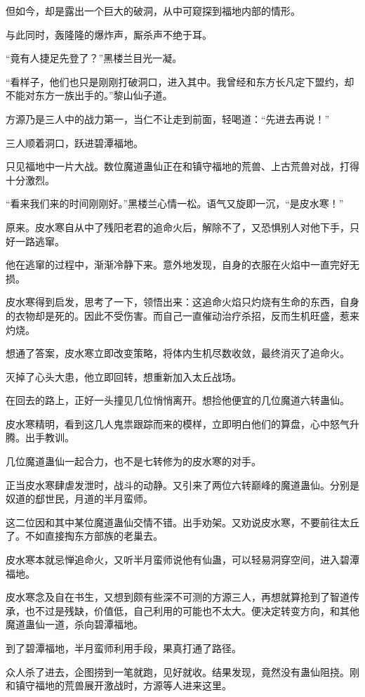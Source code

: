 \begin{this_body}
但如今，却是露出一个巨大的破洞，从中可窥探到福地内部的情形。

与此同时，轰隆隆的爆炸声，厮杀声不绝于耳。

“竟有人捷足先登了？”黑楼兰目光一凝。

“看样子，他们也只是刚刚打破洞口，进入其中。我曾经和东方长凡定下盟约，却不能对东方一族出手的。”黎山仙子道。

方源乃是三人中的战力第一，当仁不让走到前面，轻喝道：“先进去再说！”

三人顺着洞口，跃进碧潭福地。

只见福地中一片大战。数位魔道蛊仙正在和镇守福地的荒兽、上古荒兽对战，打得十分激烈。

“看来我们来的时间刚刚好。”黑楼兰心情一松。语气又旋即一沉，“是皮水寒！”

原来。皮水寒自从中了残阳老君的追命火后，解除不了，又恐惧别人对他下手，只好一路逃窜。

他在逃窜的过程中，渐渐冷静下来。意外地发现，自身的衣服在火焰中一直完好无损。

皮水寒得到启发，思考了一下，领悟出来：这追命火焰只灼烧有生命的东西，自身的衣物却是死的。因此不受伤害。而自己一直催动治疗杀招，反而生机旺盛，惹来灼烧。

想通了答案，皮水寒立即改变策略，将体内生机尽数收敛，最终消灭了追命火。

灭掉了心头大患，他立即回转，想重新加入太丘战场。

在回去的路上，正好一头撞见几位悄悄离开。想捡他便宜的几位魔道六转蛊仙。

皮水寒精明，看到这几人鬼祟跟踪而来的模样，立即明白他们的算盘，心中怒气升腾。出手教训。

几位魔道蛊仙一起合力，也不是七转修为的皮水寒的对手。

正当皮水寒肆虐发泄时，战斗的动静。又引来了两位六转巅峰的魔道蛊仙。分别是奴道的郄世民，月道的半月蛮师。

这二位因和其中某位魔道蛊仙交情不错。出手劝架。又劝说皮水寒，不要前往太丘了。不如直接掏东方部族的老巢去。

皮水寒本就忌惮追命火，又听半月蛮师说他有仙蛊，可以轻易洞穿空间，进入碧潭福地。

皮水寒念及自在书生，又想到颇有些深不可测的方源三人，再想就算抢到了智道传承，也不过是残缺，价值低，自己利用的可能也不太大。便决定转变方向，和其他魔道蛊仙一道，杀向碧潭福地。

到了碧潭福地，半月蛮师利用手段，果真打通了路径。

众人杀了进去，企图捞到一笔就跑，见好就收。结果发现，竟然没有蛊仙阻挠。刚和镇守福地的荒兽展开激战时，方源等人进来这里。


\end{this_body}
